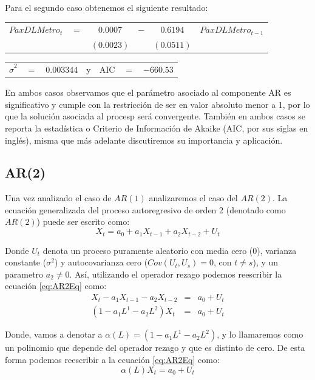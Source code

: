 \documentclass[
]{book}
\begin{document}
Para el segundo caso obtenemos el siguiente resultado:

\begin{center}
\begin{tabular}{ c c c c c c } 
    $PaxDLMetro_t$ & $=$ & $0.0007$ & $-$ & $0.6194$  & $PaxDLMetro_{t-1}$ \\ 
    &  & $(0.0023)$ &  & $(0.0511)$ & 
\end{tabular}
\end{center}

\begin{center}
\begin{tabular}{ c c c c c c c } 
    $\hat{\sigma}^2$ & $=$ & $0.003344$ & y & AIC & $=$ & $-660.53$ 
\end{tabular}
\end{center}

En ambos casos observamos que el parámetro asociado al componente AR es significativo y cumple con la restricción de ser en valor absoluto menor a 1, por lo que la solución asociada al procesp será convergente. También en ambos casos se reporta la estadística o Criterio de Información de Akaike (AIC, por sus siglas en inglés), misma que más adelante discutiremos su importancia y aplicación.

\hypertarget{ar2}{%
\subsection{AR(2)}\label{ar2}}

Una vez analizado el caso de \(AR(1)\) analizaremos el caso del \(AR(2)\). La ecuación generalizada del proceso autoregresivo de orden 2 (denotado como \(AR(2)\)) puede ser escrito como:
\begin{equation}
    X_t = a_0 + a_1 X_{t-1} + a_2 X_{t-2} + U_t
    \label{eq:AR2Eq}
\end{equation}

Donde \(U_t\) denota un proceso puramente aleatorio con media cero (\(0\)), varianza constante (\(\sigma^2\)) y autocovarianza cero (\(Cov(U_t, U_s) = 0\), con \(t \neq s\)), y un parametro \(a_2 \neq 0\). Así, utilizando el operador rezago podemos reescribir la ecuación
\eqref{eq:AR2Eq} como:
\begin{eqnarray*}     
    X_t - a_1 X_{t-1} - a_2 X_{t-2} & = & a_0 + U_t \\
    (1 - a_1 L^1 - a_2 L^2) X_t & = & a_0 + U_t
\end{eqnarray*}

Donde, vamos a denotar a \(\alpha (L) = (1 - a_1 L^1 - a_2 L^2)\), y lo llamaremos como un polinomio que depende del operador rezago y que es distinto de cero. De esta forma podemos reescribir a la ecuación \eqref{eq:AR2Eq} como:
\begin{equation}
    \alpha(L) X_t = a_0 + U_t
\end{equation}
\end{document}
